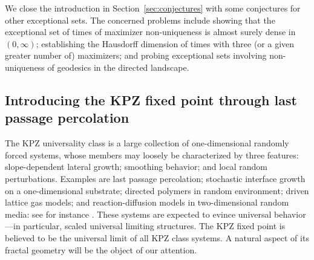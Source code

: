 \documentclass[oneside,final,11pt]{amsart}
\theoremstyle{definition}
\newcommand{\1}[1]{\mathbf{1}_{#1}}
\numberwithin{equation}{section}
\begin{document}
We close the introduction in Section~\ref{sec:conjectures} with some conjectures for other exceptional sets.%
The concerned problems include showing that the exceptional set of times of maximizer non-uniqueness is almost surely dense in $(0,\infty)$; establishing the Hausdorff dimension of times with three (or a given greater number of) maximizers; and probing exceptional sets involving non-uniqueness of geodesics in the directed landscape.




\subsection{Introducing the KPZ fixed point through last passage percolation}

The KPZ universality class is a large collection of one-dimensional randomly forced systems, whose members may loosely be characterized by three features: slope-dependent lateral growth; smoothing behavior; and local random perturbations. Examples are last passage percolation; stochastic interface growth on a one-dimensional substrate; directed polymers in random environment; driven lattice gas models; and reaction-diffusion models in two-dimensional random media: see for instance \cite{corwinReview,quastelCDM,quastelSpohn,hht,Takeuchi}. These systems are expected to evince universal behavior---in particular, scaled universal limiting structures.
The KPZ fixed point is believed to be the universal limit of all KPZ class systems. A natural aspect of its fractal geometry will be the object of our attention.
\end{document}
